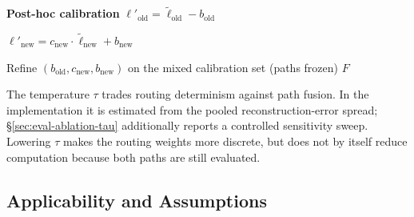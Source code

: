 \begin{algorithm}[t]
\SetAlgoNoLine
{}
\textbf{Post-hoc calibration}\;
\Indp
$\ell'_{\mathrm{old}}
=\tilde{\ell}_{\mathrm{old}}-b_{\mathrm{old}}$\;

$\ell'_{\mathrm{new}}
=c_{\mathrm{new}}\cdot\tilde{\ell}_{\mathrm{new}}+b_{\mathrm{new}}$\;

Refine $(b_{\mathrm{old}}, c_{\mathrm{new}}, b_{\mathrm{new}})$ on the mixed calibration set (paths frozen)\;
\Indm
\Return $F$
\caption{Reconstruction-Aware Routing (RAR)}
\label{alg:rar}
\end{algorithm}

The temperature $\tau$ trades routing determinism against path fusion. In the implementation it is estimated from the pooled reconstruction-error spread; \S\ref{sec:eval-ablation-tau} additionally reports a controlled sensitivity sweep. Lowering $\tau$ makes the routing weights more discrete, but does not by itself reduce computation because both paths are still evaluated.

\subsection{Applicability and Assumptions}\label{sec:assumptions}

